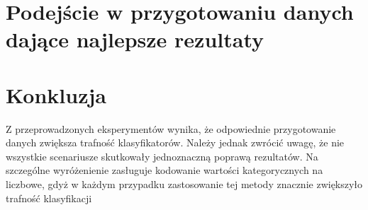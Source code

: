 \documentclass{book}
\begin{document}
\section{Podejście w przygotowaniu danych dające najlepsze rezultaty}

\section{Konkluzja}

Z przeprowadzonych eksperymentów wynika, 
że odpowiednie przygotowanie danych zwiększa trafność 
klasyfikatorów. Należy jednak zwrócić uwagę, że nie wszystkie 
scenariusze skutkowały jednoznaczną poprawą rezultatów. 
Na szczególne wyróżenienie zasługuje kodowanie wartości 
kategorycznych na liczbowe, gdyż w każdym przypadku zastosowanie 
tej metody znacznie zwiększyło trafność klasyfikacji
\end{document}
